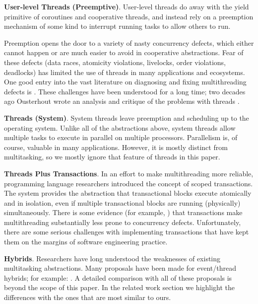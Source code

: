 \documentclass[9pt,preprint]{sigplanconf}
\begin{document}
\textbf{User-level Threads (Preemptive)}.
User-level threads do away with the yield primitive of coroutines and cooperative threads, and instead rely on a preemption mechanism of some kind to interrupt running tasks to allow others to run.

Preemption opens the door to a variety of nasty concurrency defects, which either cannot happen or are much easier to avoid in cooperative abstractions.
Fear of these defects (data races, atomicity violations, livelocks, order violations, deadlocks) has limited the use of threads in many applications and ecosystems.
One good entry into the vast literature on diagnosing and fixing multithreading defects is \cite{Lu2008}.
These challenges have been understood for a long time; two decades ago Ousterhout wrote an analysis and critique of the problems with threads \cite{Ousterhout1996}.

\textbf{Threads (System)}.
System threads leave preemption and scheduling up to the operating system.
Unlike all of the abstractions above, system threads allow multiple tasks to execute in parallel on multiple processors.
Parallelism is, of course, valuable in many applications.
However, it is mostly distinct from multitasking, so we mostly ignore that feature of threads in this paper.

\textbf{Threads Plus Transactions}.
In an effort to make multithreading more reliable, programming language researchers introduced the concept of scoped transactions.
The system provides the abstraction that transactional blocks execute atomically and in isolation, even if multiple transactional blocks are running (physically) simultaneously.
There is some evidence (for example, \cite{Pankratius2014}) that transactions make multithreading substantially less prone to concurrency defects.
Unfortunately, there are some serious challenges with implementing transactions that have kept them on the margins of software engineering practice.

\textbf{Hybrids}.
Researchers have long understood the weaknesses of existing multitasking abstractions.
Many proposals have been made for event/thread hybrids; for example: \cite{Boudol2007, Boussinot2006, Cunningham2005, Dabrowski2006, Fischer2007, Kerneis2014, Krohn2007, Li2007, Behren2003}.
A detailed comparison with all of these proposals is beyond the scope of this paper.
In the related work section we highlight the differences with the ones that are most similar to ours.
\end{document}
